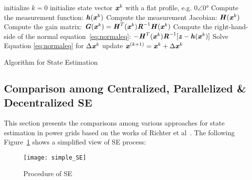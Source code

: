 \documentclass[thesis.tex]{subfiles}
\begin{document}
\begin{algorithm}[H]
	\SetAlgoLined
	initialize $k = 0$\;
	initialize state vector $\textbf{\textit{x}}^k$ with a flat profile, e.g. $0\angle\ang{0}$\;
	  {
	 	Compute the measurement function: $\textbf{\textit{h}}(\textbf{\textit{x}}^{k})$\;
	 	Compute the measurement Jacobian: $\textbf{\textit{H}}(\textbf{\textit{x}}^{k})$\;
	 	Compute the gain matrix: $\textbf{\textit{G}}(\textbf{\textit{x}}^{k}) = \textbf{\textit{H}}^{T}(\textbf{\textit{x}}^{k})\textbf{\textit{R}}^{-1}\textbf{\textit{H}}(\textbf{\textit{x}}^{k})$\;
	 	 Compute the right-hand-side of the normal equation~\ref{eq:normaleq}: $-\textbf{\textit{H}}^{T}(\textbf{\textit{x}}^{k})\textbf{\textit{R}}^{-1}[\textbf{\textit{z}}-\textbf{\textit{h}}(\textbf{\textit{x}}^{k})]$\;
	 	 Solve Equation \ref{eq:normaleq} for $\Delta \textbf{\textit{x}}^{k}$\;
	 	 update $\textbf{\textit{x}}^{(k+1)} = \textbf{\textit{x}}^{k} + \Delta \textbf{\textit{x}}^{k}$\;
	 }
	\caption{Algorithm for State Estimation}
\end{algorithm}
\newpage 
\subsection{Comparison among Centralized, Parallelized \& Decentralized SE}
This section presents the comparisons among various approaches for state estimation in power grids based on the works of Richter et al~\cite{Richter2}\cite{Richter3}. The following Figure~\ref{fig:simple_SE} shows a simplified view of SE process:
\begin{figure}[H]
	\centering
	\texttt{[image: simple\_SE]}
	\caption{Procedure of SE}
	\label{fig:simple_SE}
\end{figure}
\end{document}
